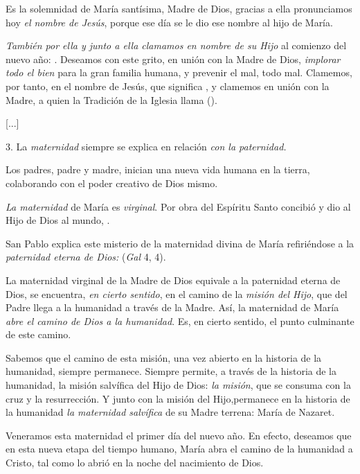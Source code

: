 \begin{body}
	Es la solemnidad de María santísima, Madre de Dios, gracias a ella pronunciamos hoy \emph{el nombre de Jesús}, porque ese día se le dio ese nombre al hijo de María.
	
	\emph{También por ella y junto a ella clamamos en nombre de su Hijo} al comienzo del nuevo año: . Deseamos con este grito, en unión con la Madre de Dios, \emph{implorar todo el bien} para la gran familia humana, y prevenir el mal, todo mal. Clamemos, por tanto, en el nombre de Jesús, que significa , y clamemos en unión con la Madre, a quien la Tradición de la Iglesia llama  ().
	
	{[}...{]}
	
	3. La \emph{maternidad} siempre se explica en relación \emph{con la 	paternidad.}
	
	Los padres, padre y madre, inician una nueva vida humana en la tierra, colaborando con el poder creativo de Dios mismo.
	
	\emph{La maternidad} de María es \emph{virginal}. Por obra del Espíritu Santo concibió y dio al Hijo de Dios al mundo, .
	
	San Pablo explica este misterio de la maternidad divina de María refiriéndose a la \emph{paternidad eterna de Dios:}  (\emph{Gal} 4, 4).
	
	La maternidad virginal de la Madre de Dios equivale a la paternidad eterna de Dios, se encuentra, \emph{en cierto sentido}, en el camino de la \emph{misión del Hijo}, que del Padre llega a la humanidad a través de la Madre. Así, la maternidad de María \emph{abre el camino de Dios a 	la humanidad}. Es, en cierto sentido, el punto culminante de este camino.
	
	Sabemos que el camino de esta misión, una vez abierto en la historia de la humanidad, siempre permanece. Siempre permite, a través de la historia de la humanidad, la misión salvífica del Hijo de Dios: \emph{la 	misión}, que se consuma con la cruz y la resurrección. Y junto con la misión del Hijo,permanece en la historia de la humanidad \emph{la 	maternidad salvífica} de su Madre terrena: María de Nazaret.
	
	Veneramos esta maternidad el primer día del nuevo año. En efecto, deseamos que en esta nueva etapa del tiempo humano, María abra el camino de la humanidad a Cristo, tal como lo abrió en la noche del nacimiento de Dios.
	

\end{body}
